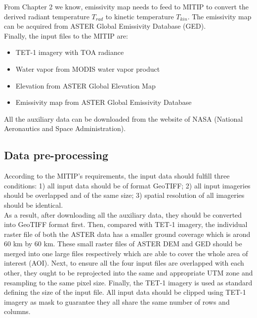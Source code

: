 \noindent From Chapter 2 we know, emissivity map needs to feed to MITIP to convert the derived radiant temperature $T_{rad}$ to kinetic temperature $T_{kin}$. The emissivity map can be acquired from ASTER Global Emissivity Database (GED).\\

\noindent Finally, the input files to the MITIP are:
\begin{itemize}
\item TET-1 imagery with TOA radiance
\item Water vapor from MODIS water vapor product
\item Elevation from ASTER Global Elevation Map
\item Emissivity map from ASTER Global Emissivity Database
\end{itemize}

\noindent All the auxiliary data can be downloaded from the website of NASA (National Aeronautics and Space Administration).\\


\subsection{Data pre-processing}
According to the MITIP's requirements, the input data should fulfill three conditions: 1) all input data should be of format GeoTIFF; 2) all input imageries should be overlapped and of the same size; 3) spatial resolution of all imageries should be identical.\\

\noindent As a result, after downloading all the auxiliary data, they should be converted into GeoTIFF format first. Then, compared with TET-1 imagery, the individual raster file of both the ASTER data has a smaller ground coverage which is arond 60 km by 60 km. These small raster files of ASTER DEM and GED should be merged into one large files respectively which are able to cover the whole area of interest (AOI). Next, to ensure all the four input files are overlapped with each other, they ought to be reprojected into the same and appropriate UTM zone and resampling to the same pixel size. Finally, the TET-1 imagery is used as standard defining the size of the input file. All input data should be clipped using TET-1 imagery as mask to guarantee they all share the same number of rows and columns.\\ 

